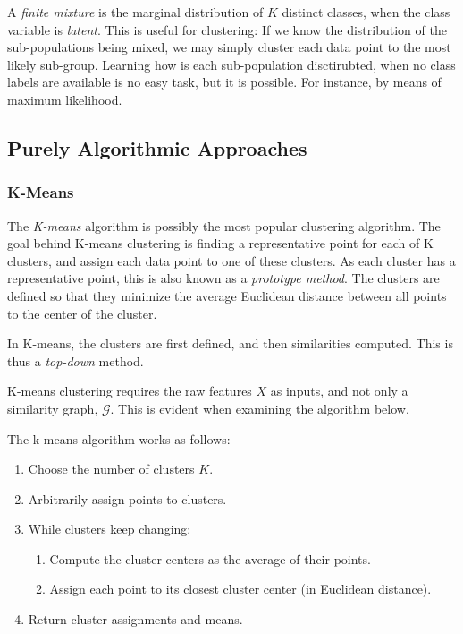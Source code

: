 \documentclass[]{book}
\providecommand{\tightlist}{%
  \setlength{\itemsep}{0pt}\setlength{\parskip}{0pt}}
\theoremstyle{definition}
\theoremstyle{definition}
\theoremstyle{definition}
\theoremstyle{remark}
\begin{document}
A \emph{finite mixture} is the marginal distribution of \(K\) distinct classes, when the class variable is \emph{latent}.
This is useful for clustering:
If we know the distribution of the sub-populations being mixed, we may simply cluster each data point to the most likely sub-group.
Learning how is each sub-population disctirubted, when no class labels are available is no easy task, but it is possible.
For instance, by means of maximum likelihood.

\hypertarget{purely-algorithmic-approaches-1}{%
\subsection{Purely Algorithmic Approaches}\label{purely-algorithmic-approaches-1}}

\hypertarget{k-means}{%
\subsubsection{K-Means}\label{k-means}}

The \emph{K-means} algorithm is possibly the most popular clustering algorithm.
The goal behind K-means clustering is finding a representative point for each of K clusters, and assign each data point to one of these clusters.
As each cluster has a representative point, this is also known as a \emph{prototype method}.
The clusters are defined so that they minimize the average Euclidean distance between all points to the center of the cluster.

In K-means, the clusters are first defined, and then similarities computed.
This is thus a \emph{top-down} method.

K-means clustering requires the raw features \(X\) as inputs, and not only a similarity graph, \(\mathcal{G}\).
This is evident when examining the algorithm below.

The k-means algorithm works as follows:

\begin{enumerate}
\def\labelenumi{\arabic{enumi}.}
\tightlist
\item
  Choose the number of clusters \(K\).
\item
  Arbitrarily assign points to clusters.
\item
  While clusters keep changing:

  \begin{enumerate}
  \def\labelenumii{\arabic{enumii}.}
  \tightlist
  \item
    Compute the cluster centers as the average of their points.
  \item
    Assign each point to its closest cluster center (in Euclidean distance).
  \end{enumerate}
\item
  Return cluster assignments and means.
\end{enumerate}
\end{document}
